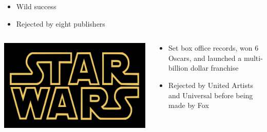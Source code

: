 \documentclass[aspectratio=169]{beamer}
\begin{document}
\begin{frame}
\begin{columns}
   \pause
   
     \begin{block}{}
       \begin{itemize}
         \item Wild success \pause
         \item Rejected by eight publishers\\
       \end{itemize}
     \end{block}
  \end{columns}

\end{frame}
\begin{frame}

  \begin{columns}
     \begin{block}{}
       \includegraphics[width=\textwidth]{figures/star-wars}
     \end{block}
   
     \begin{block}{}
       \begin{itemize}
         \item Set box office records, won 6 Oscars, and launched a multi-billion dollar franchise
         \item Rejected by United Artists and Universal before being made by Fox
       \end{itemize}
     \end{block}
  \end{columns}

\end{frame}
\end{document}
